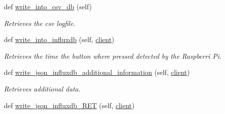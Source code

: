 \begin{DoxyCompactItemize}
def \hyperlink{classRET__data__processing_1_1RET__data__processing_a53cc9f2963d8567e8f2be4663fbe2d92}{write\+\_\+into\+\_\+csv\+\_\+db} (self)
\begin{DoxyCompactList}\small\item\em Retrieves the csv logfile. \end{DoxyCompactList}\item 
def \hyperlink{classRET__data__processing_1_1RET__data__processing_a8edbf01e68042082bbe5bc8c967f710e}{write\+\_\+into\+\_\+influxdb} (self, \hyperlink{classRET__data__processing_1_1RET__data__processing_ad5bc32b75da65fe60067f501a4bb6665}{client})
\begin{DoxyCompactList}\small\item\em Retrieves the time the button where pressed detected by the Raspberri Pi. \end{DoxyCompactList}\item 
def \hyperlink{classRET__data__processing_1_1RET__data__processing_a7ced1bb55d644f56ba40295ffed86c92}{write\+\_\+json\+\_\+influxdb\+\_\+additional\+\_\+information} (self, \hyperlink{classRET__data__processing_1_1RET__data__processing_ad5bc32b75da65fe60067f501a4bb6665}{client})
\begin{DoxyCompactList}\small\item\em Retrieves additional data. \end{DoxyCompactList}\item 
def \hyperlink{classRET__data__processing_1_1RET__data__processing_abb33542be6fa47a380328883d58d1c79}{write\+\_\+json\+\_\+influxdb\+\_\+\+R\+ET} (self, \hyperlink{classRET__data__processing_1_1RET__data__processing_ad5bc32b75da65fe60067f501a4bb6665}{client})
\end{DoxyCompactItemize}
